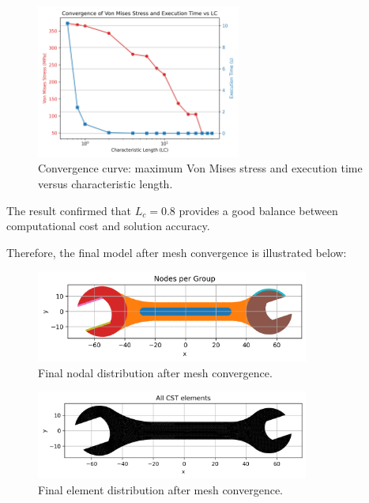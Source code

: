 \begin{figure}[H]
    \centering
    \includegraphics[width=0.6\textwidth]{GRAFICOS/convergence.png}
    \caption{Convergence curve: maximum Von Mises stress and execution time versus characteristic length.}
    \label{fig:convergence_curve}
\end{figure}

The result confirmed that $L_c = 0.8$ provides a good balance between computational cost and solution accuracy.

Therefore, the final model after mesh convergence is illustrated below:

\begin{figure}[H]
    \centering
    \includegraphics[width=0.8\textwidth]{GRAFICOS/Case a_nodes_por_grupo.png}
    \caption{Final nodal distribution after mesh convergence.}
    \label{fig:final_nodes}
\end{figure}
  
\begin{figure}[H]
    \centering
    \includegraphics[width=0.8\textwidth]{GRAFICOS/Case a_elementos.png}
    \caption{Final element distribution after mesh convergence.}
    \label{fig:final_elements}
\end{figure}

